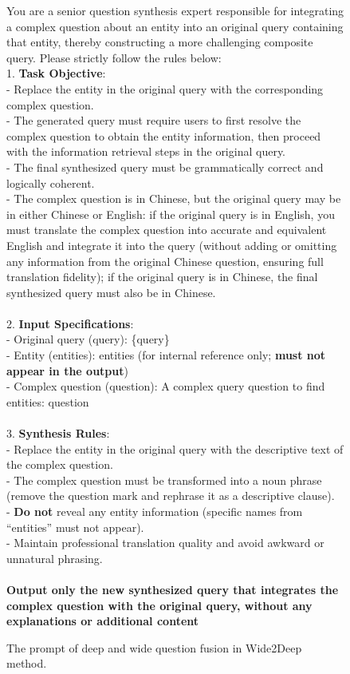 \documentclass[11pt, letterpaper, logo, onecolumn, copyright, numbering]{paper_improved}
\begin{document}
\begin{figure}[htbp]
\small
\centering
\begin{tcolorbox}
You are a senior question synthesis expert responsible for integrating a complex question about an entity into an original query containing that entity, thereby constructing a more challenging composite query. Please strictly follow the rules below:
\\
1. \textbf{Task Objective}:\\
   - Replace the entity in the original query with the corresponding complex question.\\
   - The generated query must require users to first resolve the complex question to obtain the entity information, then proceed with the information retrieval steps in the original query.\\
   - The final synthesized query must be grammatically correct and logically coherent.\\
   - The complex question is in Chinese, but the original query may be in either Chinese or English: if the original query is in English, you must translate the complex question into accurate and equivalent English and integrate it into the query (without adding or omitting any information from the original Chinese question, ensuring full translation fidelity); if the original query is in Chinese, the final synthesized query must also be in Chinese.\\
\\
2. \textbf{Input Specifications}:\\
   - Original query (query): \{query\}\\
   - Entity (entities): {entities} (for internal reference only; \textbf{must not appear in the output})\\
   - Complex question (question): A complex query question to find {entities}: {question}\\
\\
3. \textbf{Synthesis Rules}:\\
   - Replace the entity in the original query with the descriptive text of the complex question.\\
   - The complex question must be transformed into a noun phrase (remove the question mark and rephrase it as a descriptive clause).\\
   - \textbf{Do not} reveal any entity information (specific names from ``entities'' must not appear).\\
   - Maintain professional translation quality and avoid awkward or unnatural phrasing.\\
\\
\textbf{Output only the new synthesized query that integrates the complex question with the original query, without any explanations or additional content}
\end{tcolorbox}
\caption{The prompt of deep and wide question fusion in Wide2Deep method.}
\label{img:question_refinement}
\end{figure}
\end{document}
